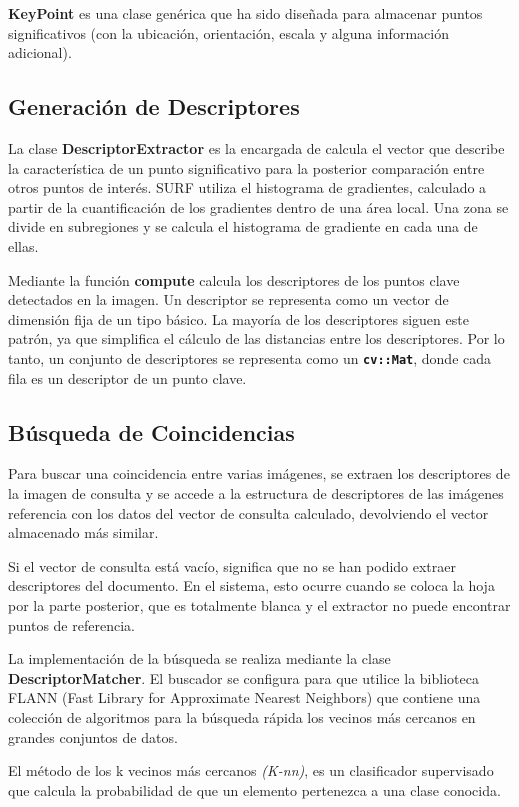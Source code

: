 \textbf{KeyPoint} es una clase genérica que ha sido diseñada para
almacenar puntos significativos (con la ubicación, orientación, escala
y alguna información adicional).

\subsection{Generación de Descriptores}
La clase \textbf{DescriptorExtractor} es la encargada de calcula
el vector que describe la característica de un punto significativo
para la posterior comparación entre otros puntos de interés. SURF
utiliza el histograma de gradientes, calculado a partir de la
cuantificación de los gradientes dentro de una área local. Una zona se divide
en subregiones y se calcula el histograma de gradiente en cada una de
ellas.

Mediante la función \textbf{compute} calcula los descriptores de los
puntos clave detectados en la imagen. Un descriptor se representa como
un vector de dimensión fija de un tipo básico. La mayoría de los
descriptores siguen este patrón, ya que simplifica el cálculo de las
distancias entre los descriptores. Por lo tanto, un conjunto de
descriptores se representa como un \textbf{\texttt{cv::Mat}}, donde cada fila
es un descriptor de un punto clave.

\subsection{Búsqueda de Coincidencias}
Para buscar una coincidencia entre varias imágenes, se extraen los
descriptores de la imagen de consulta y se accede a la estructura de
descriptores de las imágenes referencia con los
datos del vector de consulta calculado, devolviendo el vector almacenado más
similar.

Si el vector de consulta está vacío, significa que no se han podido
extraer descriptores del documento. En el sistema, esto ocurre
cuando se coloca la hoja por la parte posterior, que es totalmente
blanca y el extractor no puede encontrar puntos de referencia.

La implementación de la búsqueda se realiza mediante la clase
\textbf{DescriptorMatcher}. El buscador se configura para que utilice
la biblioteca FLANN (Fast Library for Approximate Nearest Neighbors)
que contiene una colección de algoritmos para la búsqueda rápida los
vecinos más cercanos en grandes conjuntos de datos.

El método de los k vecinos más cercanos \emph{(K-nn)}, es un clasificador
supervisado que calcula la probabilidad de que un elemento pertenezca
a una clase conocida.

